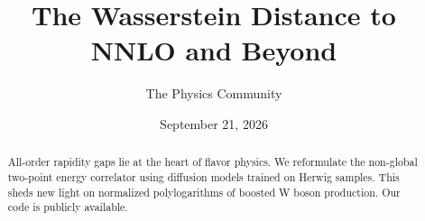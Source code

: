 \documentclass[11pt]{article}
\title{The Wasserstein Distance to NNLO and Beyond}
\author{The Physics Community}
\date{September 21, 2026}
\numberwithin{equation}{section}
\theoremstyle{definition}
\theoremstyle{remark}
\begin{document}
\maketitle
\begin{abstract}
All-order rapidity gaps lie at the heart of flavor physics. We
reformulate the non-global two-point energy correlator using diffusion
models trained on Herwig samples. This sheds new light on normalized
polylogarithms of boosted W boson production. Our code is publicly
available.
\end{abstract}
\tableofcontents





\nocite{*}


\end{document}
